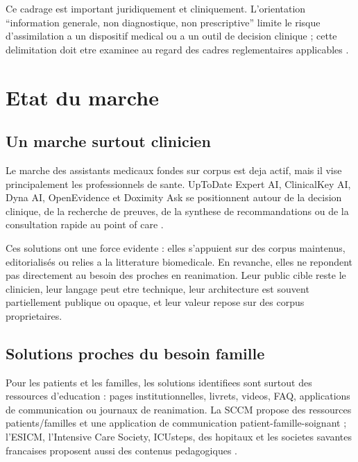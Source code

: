 \documentclass[11pt,a4paper]{article}
\begin{document}
Ce cadrage est important juridiquement et cliniquement. L'orientation \enquote{information generale, non diagnostique, non prescriptive} limite le risque d'assimilation a un dispositif medical ou a un outil de decision clinique ; cette delimitation doit etre examinee au regard des cadres reglementaires applicables \autocite{fdaGenAILifecycle,euAIActHealthcare}.

\section{Etat du marche}

\subsection{Un marche surtout clinicien}

Le marche des assistants medicaux fondes sur corpus est deja actif, mais il vise principalement les professionnels de sante. UpToDate Expert AI, ClinicalKey AI, Dyna AI, OpenEvidence et Doximity Ask se positionnent autour de la decision clinique, de la recherche de preuves, de la synthese de recommandations ou de la consultation rapide au point of care \autocite{uptodateExpertAI,clinicalKeyAI,dynaAI,openEvidence,doximityAsk}.

Ces solutions ont une force evidente : elles s'appuient sur des corpus maintenus, editorialisés ou relies a la litterature biomedicale. En revanche, elles ne repondent pas directement au besoin des proches en reanimation. Leur public cible reste le clinicien, leur langage peut etre technique, leur architecture est souvent partiellement publique ou opaque, et leur valeur repose sur des corpus proprietaires.

\subsection{Solutions proches du besoin famille}

Pour les patients et les familles, les solutions identifiees sont surtout des ressources d'education : pages institutionnelles, livrets, videos, FAQ, applications de communication ou journaux de reanimation. La SCCM propose des ressources patients/familles et une application de communication patient-famille-soignant ; l'ESICM, l'Intensive Care Society, ICUsteps, des hopitaux et les societes savantes francaises proposent aussi des contenus pedagogiques \autocite{sccmPatientFamilyResources,esicmPatientFamily,icsPatientResources,sfarInfoPatientsRea,srlfVisitesProches}.
\end{document}

